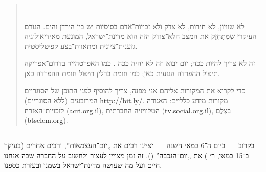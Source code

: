 \begin{quote}
\begin{center}
	\\
\end{center}

לא שוויון, לא חירות, לא צדק ולא זכויות־אדם בסיסיות יש בין הירדן והים. הגורם העיקרי שֶׁמְּתַחְזֵק את המצב הלא־צודק הזה הוא מדינת־ישראל, המוּנעת מאידיאולוגיה גזענית־ציונית ומתאוות־בצע קפיטליסטית.

זה לא צריך להיות ככה; יום יבוא וזה לא יהיה ככה . כמו האפרטהייד בדרום־אפריקה תיפול ההפרדה הגזעית כאן; כמו חומת ברלין תיפול חומת ההפרדה כאן.


{\small כדי לקרוא את המקורות אליהם אני מפנה, צריך להוסיף לפני התוכן של הסוגריים המרובעים (ללא הסוגריים) {\url{http://bit.ly/}}. מקורות מידע כלליים:
האגודה לזכויות־האזרח (\url{acri.org.il}), הטלוויזיה החברתית (\url{tv.social.org.il}), בְּצֶלֶם (\url{btselem.org}).}
\end{quote}

\hrule

בקרוב~— ביום ה־6 במאי השנה~— יציינו רבים את „יום־העצמ{\small א}ות”, ורבים אחרים (בעיקר ב־15 במאי, ר׳ ) את „יום־הנכבה” (). זה זמן מצויין לעצור ולחשוב על החברה שבה אנחנו חיים ועל מה שעושה מדינת־ישראל בשמנו ובעזרת כספנו.

